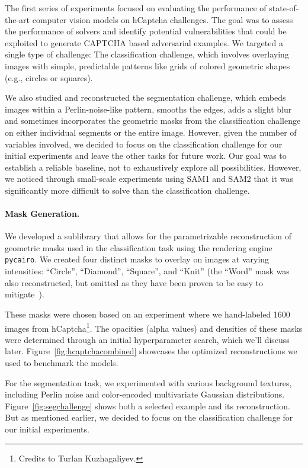 \documentclass[a4paper, oneside]{discothesis}
\begin{document}
The first series of experiments focused on evaluating the performance of state-of-the-art computer vision models on hCaptcha challenges. The goal was to assess the performance of solvers and identify potential vulnerabilities that could be exploited to generate CAPTCHA based adversarial examples. We targeted a single type of challenge: The classification challenge, which involves overlaying images with simple, predictable patterns like grids of colored geometric shapes (e.g., circles or squares).

We also studied and reconstructed the segmentation challenge, which embeds images within a Perlin-noise-like pattern, smooths the edges, adds a slight blur and sometimes incorporates the geometric masks from the classification challenge on either individual segments or the entire image. However, given the number of variables involved, we decided to focus on the classification challenge for our initial experiments and leave the other tasks for future work. Our goal was to establish a reliable baseline, not to exhaustively explore all possibilities. However, we noticed through small-scale experiments using SAM1 and SAM2 that it was significantly more difficult to solve than the classification challenge.

\paragraph{Mask Generation.}

We developed a sublibrary that allows for the parametrizable reconstruction of geometric masks used in the classification task using the rendering engine \texttt{pycairo}. We created four distinct masks to overlay on images at varying intensities: ``Circle'', ``Diamond'', ``Square'', and ``Knit'' (the ``Word'' mask was also reconstructed, but omitted as they have been proven to be easy to mitigate~\cite{zhang2023text,dong2023robust,shayegani2023plug}).

These masks were chosen based on an experiment where we hand-labeled 1600 images from hCaptcha\footnote{Credits to Turlan Kuzhagaliyev.}. The opacities (alpha values) and densities of these masks were determined through an initial hyperparameter search, which we'll discuss later. Figure~\ref{fig:hcaptchacombined} showcases the optimized reconstructions we used to benchmark the models.

For the segmentation task, we experimented with various background textures, including Perlin noise and color-encoded multivariate Gaussian distributions. Figure~\ref{fig:segchallenge} shows both a selected example and its reconstruction. But as mentioned earlier, we decided to focus on the classification challenge for our initial experiments.
\end{document}

